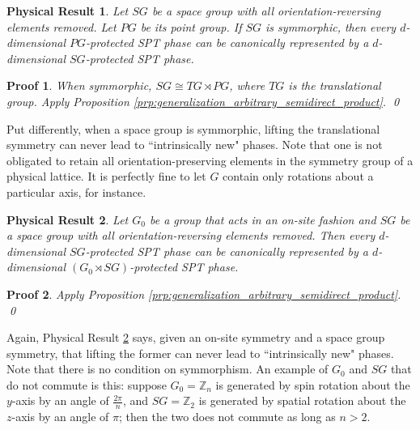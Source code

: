 \documentclass[sort&compress]{elsarticle}
\theoremstyle{theoremstyle}
\theoremstyle{framedtheoremstyle}
\newtheorem{rslt}{Physical Result}
\theoremstyle{definitionstyle}
\theoremstyle{definitionstyle}
\theoremstyle{definitionstyle}
\theoremstyle{definitionstyle}
\theoremstyle{nameddefinitionstyle}
\theoremstyle{framednameddefinitionstyle}
\theoremstyle{proofstyle}
\newtheorem{pf}{Proof}
\theoremstyle{definitionstyle}
\newcommand{\ZZZ}{\mathbb{Z}}
\newcommand{\isomorphic}{\cong}
\newcommand{\paren}[1]{\left( #1 \right)}
\begin{document}

\begin{framed}\begin{rslt}\label{rslt:space_group_TG_rtimes_PG}
Let $SG$ be a space group with all orientation-reversing elements removed. Let $PG$ be its point group. If $SG$ is symmorphic, then every $d$-dimensional $PG$-protected SPT phase can be canonically represented by a $d$-dimensional $SG$-protected SPT phase.
\end{rslt}\end{framed}

\begin{pf}
When symmorphic, $SG \isomorphic TG \rtimes PG$, where $TG$ is the translational group. Apply Proposition \ref{prp:generalization_arbitrary_semidirect_product}.
\qed\end{pf}

Put differently, when a space group is symmorphic, lifting the translational symmetry can never lead to ``intrinsically new" phases. Note that one is not obligated to retain all orientation-preserving elements in the symmetry group of a physical lattice. It is perfectly fine to let $G$ contain only rotations about a particular axis, for instance.

\begin{framed}\begin{rslt}\label{rslt:space_group_G_0_rtimes_SG}
Let $G_0$ be a group that acts in an on-site fashion and $SG$ be a space group with all orientation-reversing elements removed. Then every $d$-dimensional $SG$-protected SPT phase can be canonically represented by a $d$-dimensional $\paren{G_0 \rtimes SG}$-protected SPT phase.
\end{rslt}\end{framed}

\begin{pf}
Apply Proposition \ref{prp:generalization_arbitrary_semidirect_product}.
\qed\end{pf}

Again, Physical Result \ref{rslt:space_group_G_0_rtimes_SG} says, given an on-site symmetry and a space group symmetry, that lifting the former can never lead to ``intrinsically new" phases. Note that there is no condition on symmorphism.
An example of $G_0$ and $SG$ that do not commute is this: suppose $G_0 = \ZZZ_n$ is generated by spin rotation about the $y$-axis by an angle of $\frac{2\pi}{n}$, and $SG=\ZZZ_2$ is generated by spatial rotation about the $z$-axis by an angle of $\pi$; then the two does not commute as long as $n>2$.
\end{document}
